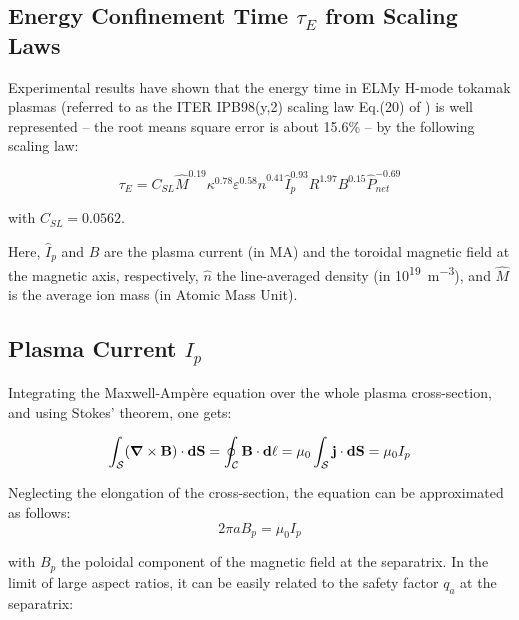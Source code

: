 \subsection{Energy Confinement Time $\tau_E$ from Scaling Laws}
Experimental results have shown that the energy time in ELMy H-mode tokamak plasmas (referred to as the ITER IPB98(y,2) scaling law Eq.(20) of ) is well represented -- the root means square error is about 15.6\% -- by the following scaling law:

\begin{equation}
	\tau_E = C_{SL} \hat M^{0.19} \kappa^{0.78} \varepsilon^{0.58} 
	\hat n^{0.41} \hat I_p^{0.93} R^{1.97} B^{0.15}  \hat P_{net}^{-0.69}
	\label{eq:scaling_law_IPB98(y,2)_adv}
\end{equation}

\noindent
with $C_{SL} = 0.0562$.


Here, $\hat I_p$ and $B$ are the plasma current (in \si{MA}) and the toroidal magnetic field at the magnetic axis, respectively, $\hat n$ the line-averaged density (in \si{10^{19}m^{-3}}), and $\hat M$ is the average ion mass (in Atomic Mass Unit). 





\subsection{Plasma Current $I_p$}

Integrating the Maxwell-Ampère equation over the whole plasma cross-section, and using Stokes' theorem, one gets:

\begin{equation*}
\int_\mathcal{S} (\mbox{\boldmath${\nabla}$}\times {\mathbf B}) \cdot \mathbf{dS} = 
\oint_\mathcal{C} \mathbf{B} \cdot \mathbf{d\ell}
= \mu_0 \int_\mathcal{S} {\mathbf j} \cdot \mathbf{dS} = \mu_0 I_p
\end{equation*}

Neglecting the elongation of the cross-section, the equation can be approximated as follows:
$$
2\pi a B_p = \mu_0 I_p
$$

\noindent
with $B_p$ the poloidal component of the magnetic field at the separatrix. In the limit of large aspect ratios, it can be easily related to the safety factor $q_a$ at the separatrix:


